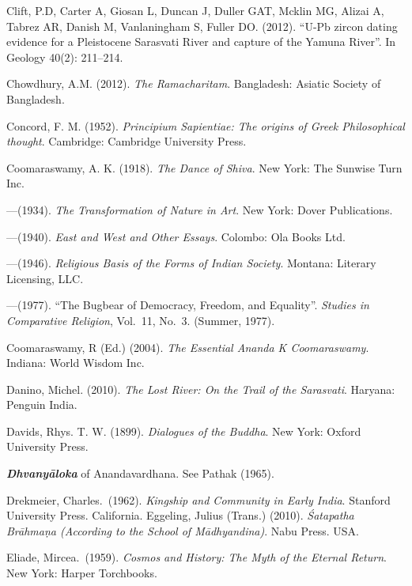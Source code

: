 \begin{thebibliography}{99}
Clift, P.D, Carter A, Giosan L, Duncan J, Duller GAT, Mcklin MG, Alizai A, Tabrez AR, Danish M, Vanlaningham S, Fuller DO. (2012). “U-Pb zircon dating evidence for a Pleistocene Sarasvati River and capture of the Yamuna River”. In Geology 40(2): 211--214.

Chowdhury, A.M. (2012). {\sl The Ramacharitam}. Bangladesh: Asiatic Society of Bangladesh. 

Concord, F. M. (1952). {\sl Principium Sapientiae: The origins of Greek Philosophical thought}. Cambridge: Cambridge University Press. 

Coomaraswamy, A. K. (1918). {\sl The Dance of Shiva}. New York: The Sunwise Turn Inc. 

---\kern3pt(1934). {\sl The Transformation of Nature in Art}. New York: Dover Publications.

---\kern3pt(1940). {\sl East and West and Other Essays}. Colombo: Ola Books Ltd. 

---\kern3pt(1946). {\sl Religious Basis of the Forms of Indian Society}. Montana: Literary Licensing, LLC.

---\kern3pt(1977). “The Bugbear of Democracy, Freedom, and Equality”. {\sl Studies in Comparative Religion}, Vol.~11, No.~3. (Summer, 1977). 

Coomaraswamy, R (Ed.) (2004). {\sl The Essential Ananda K Coomaraswamy}. Indiana: World Wisdom Inc.

Danino, Michel. (2010). {\sl The Lost River: On the Trail of the Sarasvati}. Haryana: Penguin India.  

Davids, Rhys. T. W. (1899). {\sl Dialogues of the Buddha}. New York: Oxford University Press. 

{\sl\bfseries Dhvanyāloka} of Anandavardhana. See Pathak (1965).

Drekmeier, Charles.\ (1962). {\sl Kingship and Community in Early India}. Stanford University Press. California. Eggeling, Julius (Trans.) (2010). {\sl Śatapatha Brāhmaṇa (According to the School of Mādhyandina)}. Nabu Press. USA. 

Eliade, Mircea.\ (1959). {\sl Cosmos and History: The Myth of the Eternal Return}. New York: Harper Torchbooks. 


\end{thebibliography}
